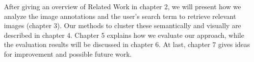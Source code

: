 \bigskip

After giving an overview of Related Work in chapter 2, we will present how we analyze the image annotations and the user's search term to retrieve relevant images (chapter 3). Our methods to cluster these semantically and visually are described in chapter 4. Chapter 5 explains how we evaluate our approach, while the evaluation results will be discussed in chapter 6. At last, chapter 7 gives ideas for improvement and possible future work.
